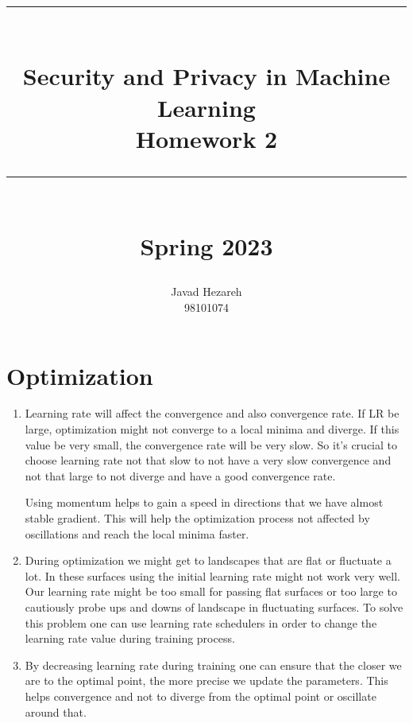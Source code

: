 \documentclass[12]{article}
\title{
	\rule{\linewidth}{0.5pt}\\
	{\LARGE Security and Privacy in Machine Learning}\\
	{\Large Homework 2}\\[-.35em]
	\rule{\linewidth}{2pt}\\
	{\normalsize Spring 2023}
}
\author{Javad Hezareh\\{\small 98101074}}
\date{}
\begin{document}
	\maketitle
	\vspace{15mm}
	\tableofcontents
	
	\pagebreak
	\section{Optimization}
	\begin{enumerate}[label=\textbf{(\alph*)}]
		\item
		Learning rate will affect the convergence and also convergence rate. If LR be large, optimization might not converge to a local minima and diverge. If this value be very small, the convergence rate will be very slow. So it's crucial to choose learning rate not that slow to not have a very slow convergence and not that large to not diverge and have a good convergence rate.
		
		Using momentum helps to gain a speed in directions that we have almost stable gradient. This will help the optimization process not affected by oscillations and reach the local minima faster.
		\item
		During optimization we might get to landscapes that are flat or fluctuate a lot. In these surfaces using the initial learning rate might not work very well. Our learning rate might be too small for passing flat surfaces or too large to cautiously probe ups and downs of landscape in fluctuating surfaces. To solve this problem one can use learning rate schedulers in order to change the learning rate value during training process.
		\item
		By decreasing learning rate during training one can ensure that the closer we are to the optimal point, the more precise we update the parameters. This helps convergence and not to diverge from the optimal point or oscillate around that.
		

\end{enumerate}
\end{document}
